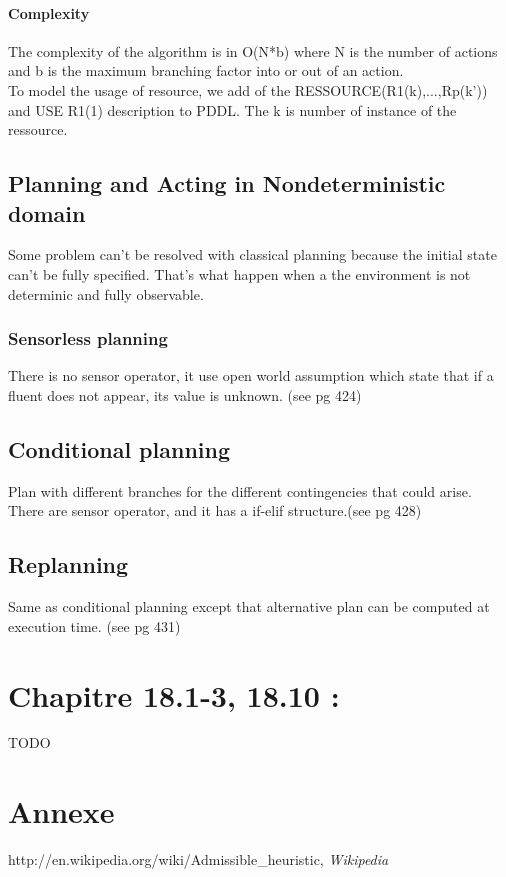 \paragraph{Complexity}  The complexity of the algorithm is in O(N*b) where N is the number of actions and 
b is the maximum branching factor into or out of an action.\\
To model the usage of resource, we add of the RESSOURCE(R1(k),...,Rp(k')) and USE R1(1) description to  
PDDL. The k is number of instance of the ressource.
\subsection{Planning and Acting in Nondeterministic domain}
Some problem can't be resolved with classical planning because the initial state can't be fully specified. That's 
what happen when a the environment is not determinic and fully observable.
\subsubsection{Sensorless planning}
There is no sensor operator, it use open world assumption which state that if a fluent does not appear, its 
value is unknown. (see pg 424) %
\subsection{Conditional planning}
Plan with different branches for the different contingencies that could arise. There are sensor operator, and it has a if-elif structure.(see pg 428)
\subsection{Replanning}
Same as conditional planning except that alternative plan can be computed at execution time.  (see pg 431)
\section{Chapitre 18.1-3, 18.10 : }
TODO


\section{Annexe}
%

\begin{thebibliography}{1}
 http://en.wikipedia.org/wiki/Admissible\_heuristic, {\em Wikipedia}
\end{thebibliography}


